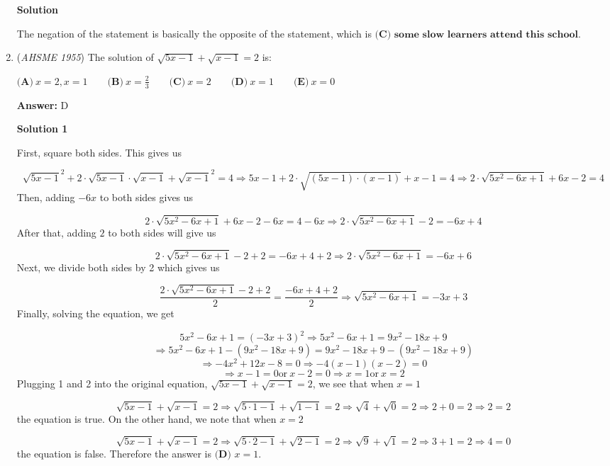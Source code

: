 \begin{enumerate}
\textbf{Solution}

The negation of the statement is basically the opposite of the statement, which is $\boxed{\textbf{(C) some slow learners attend this school.}}$



	\item (\textit{AHSME 1955}) The solution of $\sqrt{5x-1}+\sqrt{x-1}=2$ is: 


 $\textbf{(A)}\ x=2,x=1\qquad\textbf{(B)}\ x=\frac{2}{3}\qquad\textbf{(C)}\ x=2\qquad\textbf{(D)}\ x=1\qquad\textbf{(E)}\ x=0$

 \textbf{Answer: }D



\textbf{Solution 1}

First, square both sides.  This gives us

 
 \[\sqrt{5x-1}^2+2\cdot\sqrt{5x-1}\cdot\sqrt{x-1}+\sqrt{x-1}^2=4 \Longrightarrow 5x-1+2\cdot\sqrt{(5x-1)\cdot(x-1)}+x-1=4 \Longrightarrow 2\cdot\sqrt{5x^2-6x+1}+6x-2=4\]Then, adding $-6x$ to both sides gives us

 
 \[2\cdot\sqrt{5x^2-6x+1}+6x-2-6x=4-6x \Longrightarrow 2\cdot\sqrt{5x^2-6x+1}-2 =-6x+4\]After that, adding $2$ to both sides will give us

 
 \[2\cdot\sqrt{5x^2-6x+1}-2+2=-6x+4+2 \Longrightarrow 2\cdot\sqrt{5x^2-6x+1}=-6x+6\]Next, we divide both sides by 2 which gives us

 
 \[\frac{2\cdot\sqrt{5x^2-6x+1}-2+2}{2}=\frac{-6x+4+2}{2} \Longrightarrow \sqrt{5x^2-6x+1}=-3x+3\]Finally, solving the equation, we get 

 
 \[5x^2-6x+1=(-3x+3)^2 \Longrightarrow 5x^2-6x+1=9x^2-18x+9\] 
 \[\Longrightarrow 5x^2-6x+1-(9x^2-18x+9)=9x^2-18x+9-(9x^2-18x+9)\]
 \[\Longrightarrow -4x^2+12x-8=0 \Longrightarrow -4(x-1)(x-2)=0\]
 \[\Longrightarrow x-1=0 \text{or}\ x-2=0 \Longrightarrow x=1 \text{or}\ x=2\]Plugging 1 and 2 into the original equation, $\sqrt{5x-1}+\sqrt{x-1}=2$, we see that when $x=1$

 \[\sqrt{5x-1}+\sqrt{x-1}=2 \Longrightarrow \sqrt{5\cdot1-1}+\sqrt{1-1}=2 \Longrightarrow \sqrt4+\sqrt0=2 \Longrightarrow 2+0=2 \Longrightarrow 2=2\]the equation is true. On the other hand, we note that when $x=2$

 \[\sqrt{5x-1}+\sqrt{x-1}=2 \Longrightarrow \sqrt{5\cdot2-1}+\sqrt{2-1}=2 \Longrightarrow \sqrt9+\sqrt1=2 \Longrightarrow 3+1=2 \Longrightarrow 4=0\]the equation is false. Therefore the answer is $\boxed{{\textbf{(D) }} x=1}$.

 




\end{enumerate}
